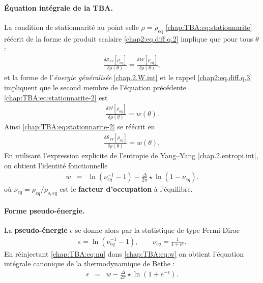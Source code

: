\paragraph{Équation intégrale de la TBA.}
La condition de stationnarité au point selle \(\rho=\rho_{\mathrm{eq}}\) \eqref{chap:TBA:eq:stationnarite} réécrit de la forme de produit scalaire \eqref{chap2:eq.diff.q.2} implique que pour tous $\theta$ :
\begin{eqnarray}\label{chap:TBA:eq:stationnarite-2}
	\frac{\delta\mathcal{S}_{YY}[\rho_{\mathrm{eq}}]}{\delta\rho(\theta)} = \frac{\delta\mathcal{W}[\rho_{\mathrm{eq}}]}{\delta\rho(\theta)},
\end{eqnarray}
et la forme de l'{\em énergie généralisée} \eqref{chap.2.W.int} et le rappel \eqref{chap2:eq.diff.q.3} impliquent que le second membre de l'équation précédente \eqref{chap:TBA:eq:stationnarite-2} est 
\begin{eqnarray}
	\frac{\delta\mathcal{W}[\rho_{\mathrm{eq}}]}{\delta\rho(\theta)}  = w(\theta).
\end{eqnarray}	
Ainsi \eqref{chap:TBA:eq:stationnarite-2} se réécrit en 
\begin{eqnarray}
	\frac{\delta\mathcal{S}_{YY}[\rho_{\mathrm{eq}}]}{\delta\rho(\theta)} = w(\theta),\label{chap:TBA:eq:stationnarite-3}
\end{eqnarray}
En utilisant l’expression explicite de l’entropie de Yang–Yang \eqref{chap.2.entropi.int}, on obtient l’identité fonctionnelle
\begin{eqnarray}
	w & = & \ln ( \nu_{\!eq}^{-1}  - 1 ) - \frac{\Delta}{2\pi} \star \ln ( 1 -  \nu_{\!eq}).\label{chap:TBA:eq:w}
\end{eqnarray}
où
\(
\nu_{\!eq}=\rho_{\!eq}/\rho_{s,\!eq}
\)
est le \textbf{facteur d’occupation} à l’équilibre.
\paragraph{Forme pseudo-énergie.}
La \textbf{pseudo-énergie} $\epsilon$ se donne alors par la statistique de type Fermi-Dirac
\begin{eqnarray}
	\epsilon =\ln(\nu^{-1}_{\!eq}-1),\qquad\nu_{\!eq}=\frac{1}{1+e^{\epsilon}}.\label{chap:TBA:eq:nu}%
\end{eqnarray}
En réinjectant \eqref{chap:TBA:eq:nu} dans \eqref{chap:TBA:eq:w} on obtient
l’équation intégrale canonique de la thermodynamique de Bethe :
\begin{eqnarray}
	\epsilon & = & w - \frac{\Delta}{2\pi} \star \ln ( 1  + e^{-\epsilon}).\label{chap:TBA:eq:e}%
\end{eqnarray}

